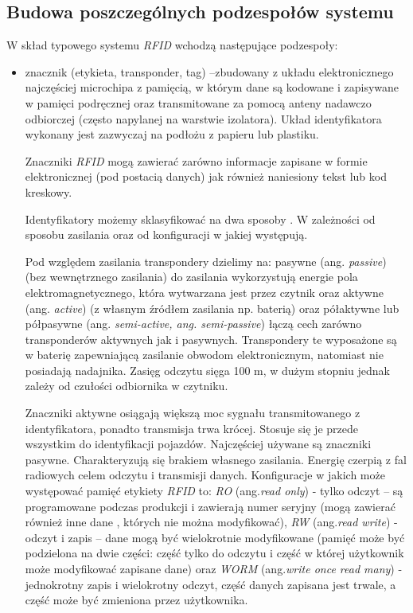 \subsection{Budowa poszczególnych podzespołów systemu}

W skład typowego systemu \emph{RFID} wchodzą następujące podzespoły:

\begin{itemize}\setlength{\itemsep}{0pt}
	\item znacznik  (etykieta, transponder, tag) –zbudowany z układu elektronicznego najczęściej microchipa z pamięcią, w którym dane są  kodowane i zapisywane w pamięci podręcznej oraz transmitowane za pomocą anteny nadawczo odbiorczej (często napylanej na warstwie izolatora). Układ identyfikatora wykonany jest zazwyczaj na podłożu z papieru lub plastiku. 

	Znaczniki \emph{RFID} mogą zawierać zarówno informacje zapisane w formie elektronicznej (pod postacią danych) jak również naniesiony tekst lub kod kreskowy. 

	Identyfikatory możemy sklasyfikować na dwa sposoby . W zależności od sposobu zasilania oraz od konfiguracji w jakiej występują.

	Pod względem zasilania transpondery dzielimy na: pasywne  (ang. \emph{passive}) (bez wewnętrznego zasilania) do zasilania  wykorzystują energie pola elektromagnetycznego, która wytwarzana jest przez czytnik oraz aktywne (ang. \emph{active}) (z własnym źródłem zasilania np. baterią) oraz półaktywne lub półpasywne (ang. \emph{semi-active, ang. semi-passive}) łączą cech zarówno transponderów aktywnych jak i pasywnych. Transpondery te wyposażone są w baterię zapewniającą zasilanie obwodom elektronicznym, natomiast nie posiadają nadajnika. Zasięg odczytu sięga 100 m, w dużym stopniu jednak zależy od czułości odbiornika w czytniku.  

	Znaczniki aktywne osiągają większą moc sygnału transmitowanego z identyfikatora, ponadto transmisja trwa krócej. Stosuje się je przede wszystkim do identyfikacji pojazdów. Najczęściej używane są znaczniki pasywne. Charakteryzują się brakiem własnego zasilania. Energię czerpią z fal radiowych celem odczytu i transmisji danych.  Konfiguracje w jakich może występować pamięć etykiety \emph{RFID} to: \emph{RO} (ang.\emph{read only}) - tylko odczyt – są programowane podczas produkcji i zawierają numer seryjny (mogą zawierać również inne dane , których nie można modyfikować), \emph{RW} (ang.\emph{read write}) - odczyt i zapis – dane mogą być wielokrotnie modyfikowane (pamięć może być podzielona na dwie części: część tylko do odczytu i część w której użytkownik może modyfikować zapisane dane) oraz \emph{WORM} (ang.\emph{write once read many}) -jednokrotny zapis i wielokrotny odczyt, część danych zapisana jest trwale, a część może być zmieniona przez użytkownika.
	

\end{itemize}
